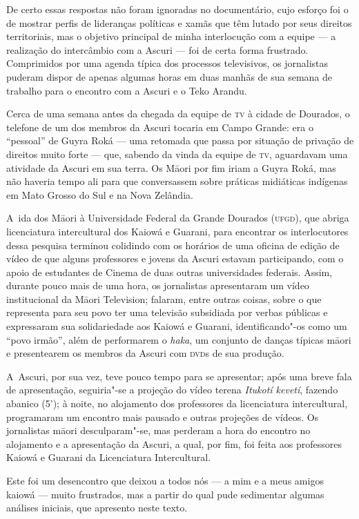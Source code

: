 De certo essas respostas não foram ignoradas no documentário, cujo
esforço foi o de mostrar perfis de lideranças políticas e xamãs que têm
lutado por seus direitos territoriais, mas o objetivo principal de
minha interlocução com a equipe --- a realização do intercâmbio com a
Ascuri --- foi de certa forma frustrado. Comprimidos por uma agenda
típica dos processos televisivos, os jornalistas puderam dispor de
apenas algumas horas em duas manhãs de sua semana de trabalho para o
encontro com a Ascuri e o Teko Arandu.

Cerca de uma semana antes da chegada da equipe de \textsc{tv} à cidade de
Dourados, o telefone de um dos membros da Ascuri tocaria em Campo
Grande: era o ``pessoal'' de Guyra Roká --- uma retomada que passa por
situação de privação de direitos muito forte --- que, sabendo da vinda da
equipe de \textsc{tv}, aguardavam uma atividade da Ascuri em sua terra. Os
M\=aori por fim iriam a Guyra Roká, mas não haveria tempo ali para que
conversassem sobre práticas midiáticas indígenas em Mato Grosso do Sul
e na Nova Zelândia. 

A~ida dos M\=aori à Universidade Federal da Grande Dourados (\textsc{ufgd}), que
abriga licenciatura intercultural dos Kaiowá e Guarani, para encontrar
os interlocutores dessa pesquisa terminou colidindo com os horários de
uma oficina de edição de vídeo de que alguns professores e jovens da
Ascuri estavam participando, com o apoio de estudantes de Cinema de
duas outras universidades federais. Assim, durante pouco mais de uma
hora, os jornalistas apresentaram um vídeo institucional da M\=aori
Television; falaram, entre outras coisas, sobre o que representa para
seu povo ter uma televisão subsidiada por verbas públicas e expressaram
sua solidariedade aos Kaiowá e Guarani, identificando"-os como um ``povo
irmão'', além de performarem o \emph{haka}, um conjunto de danças típicas
m\=aori e presentearem os membros da Ascuri com \textsc{dvd}s de sua produção. 

A~Ascuri, por sua vez, teve pouco tempo para se apresentar; após uma
breve fala de apresentação, seguiria"-se a projeção do vídeo terena
\emph{Itukotí kevetí}, fazendo abanico (5’); à noite, no alojamento dos
professores da licenciatura intercultural, programaram um encontro mais
pausado e outras projeções de vídeos. Os jornalistas m\=aori
desculparam"-se, mas perderam a hora do encontro no alojamento e a
apresentação da Ascuri, a qual, por fim, foi feita aos professores
Kaiowá e Guarani da Licenciatura Intercultural. 

Este foi um desencontro que deixou a todos nós --- a mim e a meus amigos
kaiowá --- muito frustrados, mas a partir do qual pude sedimentar algumas
análises iniciais, que apresento neste texto. 

